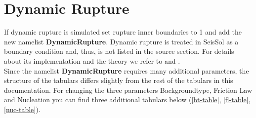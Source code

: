 \documentclass[12pt,twoside]{article}
\begin{document}
\section{Dynamic Rupture}
\noindent
If \hypertarget{dynrupture}{dynamic rupture} is simulated set rupture inner boundaries to 1
and add the new namelist \textbf{DynamicRupture}.
Dynamic rupture is treated in SeisSol as a boundary condition and, thus, is not listed in the source section.
For details about its implementation and the theory we refer to \cite{Pelties12} and \cite{Pelties14}.
\\

\noindent
Since the namelist \textbf{DynamicRupture} requires many additional parameters,
the structure of the tabulars differs slightly from the rest of the tabulars in this documentation.
For changing the three parameters Backgroundtype, Friction Law and Nucleation
you can find three additional tabulars below (\ref{bt-table}, \ref{fl-table},
 \ref{nuc-table}).

\newpage
\end{document}
